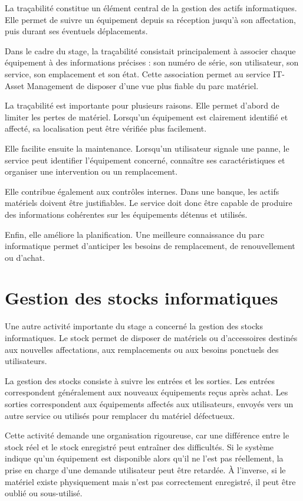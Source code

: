 \documentclass[12pt,a4paper]{report}
\begin{document}
La traçabilité constitue un élément central de la gestion des actifs informatiques. Elle permet de suivre un équipement depuis sa réception jusqu'à son affectation, puis durant ses éventuels déplacements.

Dans le cadre du stage, la traçabilité consistait principalement à associer chaque équipement à des informations précises : son numéro de série, son utilisateur, son service, son emplacement et son état. Cette association permet au service IT-Asset Management de disposer d'une vue plus fiable du parc matériel.

La traçabilité est importante pour plusieurs raisons.
Elle permet d'abord de limiter les pertes de matériel. Lorsqu'un équipement est clairement identifié et affecté, sa localisation peut être vérifiée plus facilement.

Elle facilite ensuite la maintenance. Lorsqu'un utilisateur signale une panne, le service peut identifier l'équipement concerné, connaître ses caractéristiques et organiser une intervention ou un remplacement.

Elle contribue également aux contrôles internes. Dans une banque, les actifs matériels doivent être justifiables. Le service doit donc être capable de produire des informations cohérentes sur les équipements détenus et utilisés.

Enfin, elle améliore la planification. Une meilleure connaissance du parc informatique permet d'anticiper les besoins de remplacement, de renouvellement ou d'achat.

\section{Gestion des stocks informatiques}

Une autre activité importante du stage a concerné la gestion des stocks informatiques. Le stock permet de disposer de matériels ou d'accessoires destinés aux nouvelles affectations, aux remplacements ou aux besoins ponctuels des utilisateurs.

La gestion des stocks consiste à suivre les entrées et les sorties. Les entrées correspondent généralement aux nouveaux équipements reçus après achat. Les sorties correspondent aux équipements affectés aux utilisateurs, envoyés vers un autre service ou utilisés pour remplacer du matériel défectueux.

Cette activité demande une organisation rigoureuse, car une différence entre le stock réel et le stock enregistré peut entraîner des difficultés. Si le système indique qu'un équipement est disponible alors qu'il ne l'est pas réellement, la prise en charge d'une demande utilisateur peut être retardée. À l'inverse, si le matériel existe physiquement mais n'est pas correctement enregistré, il peut être oublié ou sous-utilisé.
\end{document}
